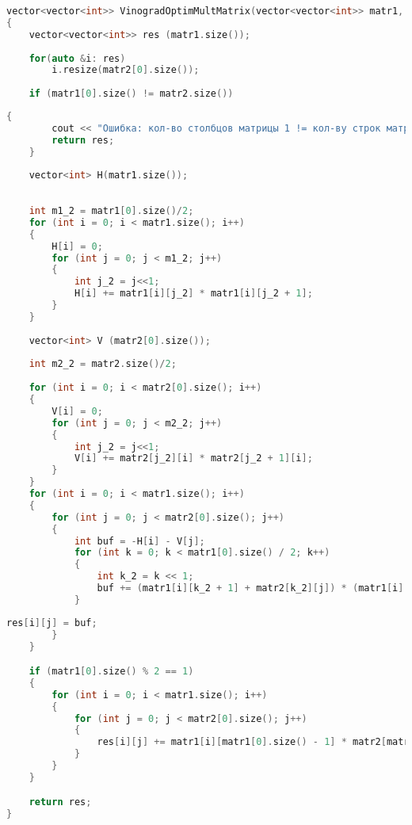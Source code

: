         \begin{lstlisting}[language=C++, label=lst:mult:VinogradOpt, caption=Алгоритм Винограда с оптимизацией]
vector<vector<int>> VinogradOptimMultMatrix(vector<vector<int>> matr1, vector<vector<int>> matr2)
{
    vector<vector<int>> res (matr1.size());
    
    for(auto &i: res)
        i.resize(matr2[0].size());
    
    if (matr1[0].size() != matr2.size())
    \end{lstlisting}
    \par \text{   }
        \begin{lstlisting}[language=C++, label=lst:mult:VinogradOpt_1, caption=Алгоритм Винограда с оптимизацией]
    {
        cout << "Ошибка: кол-во столбцов матрицы 1 != кол-ву строк матрицы 2" << endl;
        return res;
    }
    
    vector<int> H(matr1.size());
    
    
    int m1_2 = matr1[0].size()/2;
    for (int i = 0; i < matr1.size(); i++)
    {
        H[i] = 0;
        for (int j = 0; j < m1_2; j++)
        {
            int j_2 = j<<1;
            H[i] += matr1[i][j_2] * matr1[i][j_2 + 1];
        }
    }
    
    vector<int> V (matr2[0].size());
    
    int m2_2 = matr2.size()/2;
    
    for (int i = 0; i < matr2[0].size(); i++)
    {
        V[i] = 0;
        for (int j = 0; j < m2_2; j++)
        {
            int j_2 = j<<1;
            V[i] += matr2[j_2][i] * matr2[j_2 + 1][i];
        }
    }
    for (int i = 0; i < matr1.size(); i++)
    {
        for (int j = 0; j < matr2[0].size(); j++)
        {
            int buf = -H[i] - V[j];
            for (int k = 0; k < matr1[0].size() / 2; k++)
            {
                int k_2 = k << 1;
                buf += (matr1[i][k_2 + 1] + matr2[k_2][j]) * (matr1[i][k_2] + matr2[k_2 + 1][j]);
            }
            \end{lstlisting}

        \begin{lstlisting}[language=C++, label=lst:mult:VinogradOpt_2, caption=Алгоритм Винограда с оптимизацией]
            res[i][j] = buf;
        }
    }

    if (matr1[0].size() % 2 == 1)
    {
        for (int i = 0; i < matr1.size(); i++)
        {
            for (int j = 0; j < matr2[0].size(); j++)
            {
                res[i][j] += matr1[i][matr1[0].size() - 1] * matr2[matr1[0].size() - 1][j];
            }
        }
    }

    return res;
}
        \end{lstlisting}
